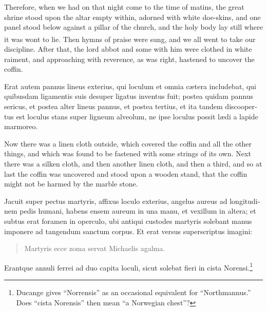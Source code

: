 \documentclass{book}
\newcounter{engnote}
\newcommand{\engnotenum}{\textsuperscript{\arabic{engnote}\stepcounter{engnote}}}
\begin{document}
\begin{paracol}{2}
\switchcolumn

Therefore, when we had on that night come to the time of matins, the great shrine stood upon the altar empty within, adorned with white doe-skins, and one panel stood below against a pillar of the church, and the holy body lay still where it was wont to lie.\engnotenum{} Then hymns of praise were sung, and we all went to take our discipline. After that, the lord abbot and some with him were clothed in white raiment, and approaching with reverence, as was right, hastened to uncover the coffin.

\switchcolumn*

\begin{otherlanguage}{latin}
Erat autem pannus lineus exterius, qui loculum et omnia c\ae{}tera includebat, qui quibusdam ligamentis suis desuper ligatus inventus fuit; postea quidam pannus sericus, et postea alter lineus pannus, et postea tertius, et ita tandem discoopertus est loculus stans super ligneum alveolum, ne ipse loculus possit l\ae{}di a lapide marmoreo.
\end{otherlanguage}

\switchcolumn

Now there was a linen cloth outside, which covered the coffin and all the other things, and which was found to be fastened with some strings of its own. Next there was a silken cloth, and then another linen cloth, and then a third, and so at last the coffin was uncovered and stood upon a wooden stand, that the coffin might not be harmed by the marble stone.

\switchcolumn*

\begin{otherlanguage}{latin}
Jacuit super pectus martyris, affixus loculo exterius, angelus aureus ad longitudinem pedis humani, habens ensem aureum in una manu, et vexillum in altera; et subtus erat foramen in operculo, ubi antiqui custodes martyris solebant manus imponere ad tangendum sanctum corpus. Et erat versus superscriptus imagini:
\begin{verse}
Martyris ecce zoma servat Michaelis agalma.
\end{verse}
Erantque annuli ferrei ad duo capita loculi, sicut solebat fieri in cista Norensi.\footnote[\textdagger]{Ducange gives ``Norrensis'' as an occasional equivalent for ``Northmannus.'' Does ``cista Norensis'' then mean ``a Norwegian chest''?}
\end{otherlanguage}

\switchcolumn


\end{paracol}
\end{document}
